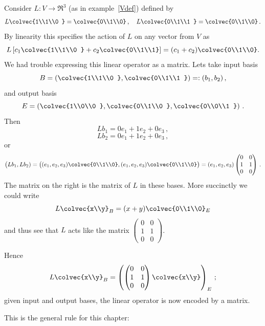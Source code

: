 \begin{example}
Consider 
$L:V\to \Re^3$ (as in example~\ref{Vdef}) defined by 
$$
L\colvec{1\\1\\0 } = \colvec{0\\1\\0}\, ,\quad
L\colvec{0\\1\\1 } = \colvec{0\\1\\0}\, .
$$
By linearity this specifies the action of $L$ on any vector from $V$ as
$$
L\left[ c_1\colvec{1\\1\\0 } + c_2 \colvec{0\\1\\1} \right]= (c_1+c_2)\colvec{0\\1\\0}.
$$
We had trouble expressing this linear operator as a matrix. Lets take input basis
$$
B=\left(\colvec{1\\1\\0 } ,\colvec{0\\1\\1 }\right)=:(b_1,b_2)\, ,
$$
and output basis 
$$
E=\left(\colvec{1\\0\\0 } ,\colvec{0\\1\\0 } ,\colvec{0\\0\\1 }\right)\, .
$$
Then
$$
L b_1 = 0 e_1 + 1e_2+ 0  e_3 \, ,
$$
$$
L b_2 = 0 e_1 + 1e_2+ 0  e_3 \, ,
$$
or 
$$
\big(Lb_1, L b_2) = \big( (e_1,e_2,e_3)\colvec{0\\1\\0}, (e_1,e_2,e_3)\colvec{0\\1\\0}\big)=(e_1,e_2,e_3)\begin{pmatrix}0&0\\1&1\\0&0
\end{pmatrix}\, .
$$
The matrix on the right is the matrix of $L$ in these bases.
More succinctly we could write
$$
L\colvec{x\\y}_B=(x+y) \colvec{0\\1\\0}_E
$$
and thus see that $L$ acts like the matrix 
$
\begin{pmatrix}
0&0\\
1&1\\
0&0
\end{pmatrix}
$.

Hence
$$L\colvec{x\\y}_B
=\left(  \begin{pmatrix}
0&0\\
1&1\\
0&0
\end{pmatrix}
\colvec{x\\y} \right)_E\, ;
$$
given input and output bases, the linear operator is now encoded by a matrix.
\end{example}
This is the general rule for this chapter:



